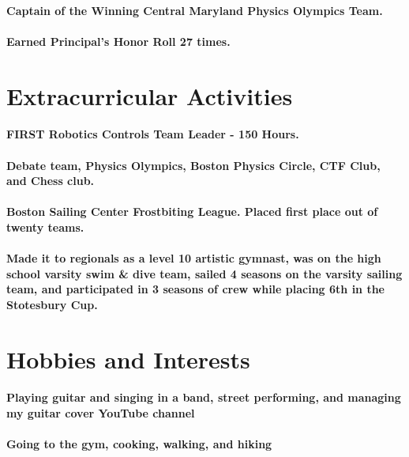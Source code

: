 \documentclass{article}
\begin{document}
\paragraph{Captain of the Winning Central Maryland Physics Olympics Team.}

\paragraph{Earned Principal's Honor Roll 27 times.}

\section{Extracurricular Activities}

\paragraph{FIRST Robotics Controls Team Leader - 150 Hours.}

\paragraph{Debate team, Physics Olympics, Boston Physics Circle, CTF Club, and Chess club.}
\paragraph{Boston Sailing Center Frostbiting League. Placed first place out of twenty teams.}
\paragraph{Made it to regionals as a level 10 artistic gymnast, was on the high school varsity swim \& dive team, sailed 4 seasons on the varsity sailing team, and participated in 3 seasons of crew while placing 6th in the Stotesbury Cup.}


\section{Hobbies and Interests}

\paragraph{Playing guitar and singing in a band, street performing, and managing my guitar cover YouTube channel}

\paragraph{Going to the gym, cooking, walking, and hiking}
\end{document}
